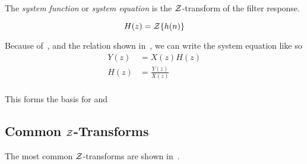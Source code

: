 \begin{definition}\label{def:System_Function}
  The \emph{system function} or \emph{system equation} is the $\operatorname{\mathcal{Z}}$-transform of the filter response.

  \begin{equation}\label{eq:System_Function}
     H(z) = \operatorname{\mathcal{Z}} \lbrace h(n) \rbrace
   \end{equation}

   Because of~, and the relation shown in~, we can write the system equation like so
   \begin{equation}\label{eq:System_Function-LTI_System}
     \begin{aligned}
       Y(z) &= X(z) H(z) \\
       H(z) &= \frac{Y(z)}{X(z)} \\
     \end{aligned}
   \end{equation}

   This forms the basis for  and 
\end{definition}

\subsection{Common \texorpdfstring{$\operatorname{\mathcal{Z}}$-Transforms}{Z-Transforms}}\label{subsubsec:Common Z-Transforms}
The most common $\operatorname{\mathcal{Z}}$-transforms are shown in~.

